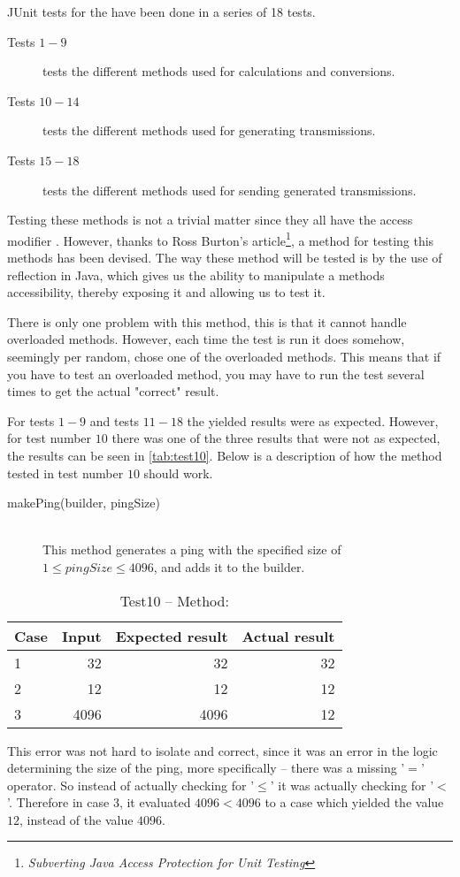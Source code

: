 JUnit tests for the  have been done in a series of 18 tests. %
\begin{description}
	\item[Tests $1-9$] tests the different methods used for calculations and conversions.
	\item[Tests $10-14$] tests the different methods used for generating transmissions.
	\item[Tests $15-18$] tests the different methods used for sending generated transmissions.
\end{description}
Testing these methods is not a trivial matter since they all have the access modifier . However, thanks to Ross Burton's article\footnote{\textit{Subverting Java Access Protection for Unit Testing}\cite{onJava}}, a method for testing this methods has been devised. The way these method will be tested is by the use of reflection in Java, which gives us the ability to manipulate a methods accessibility, thereby exposing it and allowing us to test it. 

There is only one problem with this method, this is that it cannot handle overloaded methods. However, each time the test is run it does somehow, seemingly per random, chose one of the overloaded methods. This means that if you have to test an overloaded method, you may have to run the test several times to get the actual "correct" result.

For tests $1-9$ and tests $11-18$ the yielded results were as expected. However, for test number $10$ there was one of the three results that were not as expected, the results can be seen in \autoref{tab:test10}. 
Below is a description of how the method tested in test number $10$ should work.
\begin{description}
	\item[makePing(builder, pingSize)] \hfill \\
	This method generates a ping with the specified size of $1\leq pingSize \leq 4096$, and adds it to the builder.
\end{description}
\begin{table}[H]
	\centering
	\begin{tabular}{ l | r | r | r }
		Case & Input & Expected result & Actual result \\
		\hline
		1 & 32 & 32 & 32 \\
		\hline
		2 & 12 & 12 & 12 \\
		\hline
		3 & 4096 & 4096 & 12 \\
	\end{tabular}
	\caption{Test10 -- Method: }
	\label{tab:test10}
\end{table}
This error was not hard to isolate and correct, since it was an error in the logic determining the size of the ping, more specifically -- there was a missing '$=$' operator. So instead of actually checking for '$\leq$' it was actually checking for '$<$'. Therefore in case 3, it evaluated $4096<4096$ to a case which yielded the value $12$, instead of the value $4096$.